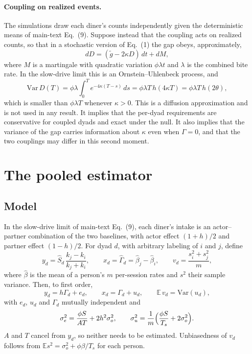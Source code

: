 \documentclass[12pt]{article}
\theoremstyle{definition}
\newcommand{\ki}{k_i}
\newcommand{\kj}{k_j}
\newcommand{\gt}{\tilde{g}}
\begin{document}
\paragraph{Coupling on realized events.} The simulations draw each diner's counts
independently given the deterministic means of main-text Eq.~(9). Suppose instead
that the coupling acts on realized counts, so that in a stochastic version of
Eq.~(1) the gap obeys, approximately,
\[
dD=(\gt-2\kappa D)\,dt+dM,
\]
where $M$ is a martingale with quadratic variation $\phi\lambda t$ and $\lambda$ is
the combined bite rate. In the slow-drive limit this is an Ornstein--Uhlenbeck
process, and
\[
\mathrm{Var}\,D(T)=\phi\lambda\int_0^Te^{-4\kappa(T-s)}\,ds=\phi\lambda T\,h(4\kappa T)=\phi\lambda T\,h(2\theta),
\]
which is smaller than $\phi\lambda T$ whenever $\kappa>0$. This is a diffusion
approximation and is not used in any result. It implies that the per-dyad
requirements are conservative for coupled dyads and exact under the null. It also
implies that the variance of the gap carries information about $\kappa$ even when
$\Gamma=0$, and that the two couplings may differ in this second moment.

\section{The pooled estimator}\label{sec:pooled}

\subsection{Model}

In the slow-drive limit of main-text Eq.~(9), each diner's intake is an
actor--partner combination of the two baselines, with actor effect $(1+h)/2$ and
partner effect $(1-h)/2$. For dyad $d$, with arbitrary labeling of $i$ and $j$,
define
\[
y_d=\hat S_d\,\frac{\kj-\ki}{\kj+\ki},\qquad
x_d=\hat\Gamma_d=\hat\beta_j-\hat\beta_i,\qquad
v_d=\frac{s_i^2+s_j^2}{m},
\]
where $\hat\beta$ is the mean of a person's $m$ per-session rates and $s^2$ their
sample variance. Then, to first order,
\[
y_d=h\Gamma_d+e_d,\qquad x_d=\Gamma_d+u_d,\qquad \mathbb{E}\,v_d=\mathrm{Var}(u_d),
\]
with $e_d$, $u_d$ and $\Gamma_d$ mutually independent and
\[
\sigma_e^2=\frac{\phi S}{AT}+2h^2\sigma_o^2,\qquad
\sigma_u^2=\frac{1}{m}\Bigl(\frac{\phi S}{T_s}+2\sigma_o^2\Bigr).
\]
$A$ and $T$ cancel from $y_d$, so neither needs to be estimated. Unbiasedness of
$v_d$ follows from $\mathbb{E}s^2=\sigma_o^2+\phi\beta/T_s$ for each person.
\end{document}
